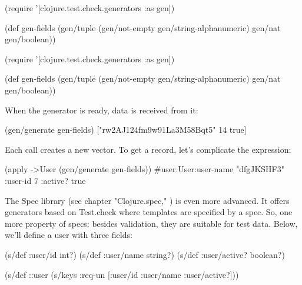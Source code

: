 \ifnarrow

\begin{english}
  \begin{clojure}
(require
 '[clojure.test.check.generators
   :as gen])

(def gen-fields
  (gen/tuple
    (gen/not-empty
      gen/string-alphanumeric)
    gen/nat
    gen/boolean))
  \end{clojure}
\end{english}

\else

\begin{english}
  \begin{clojure}
(require '[clojure.test.check.generators :as gen])

(def gen-fields
  (gen/tuple (gen/not-empty gen/string-alphanumeric)
             gen/nat
             gen/boolean))
  \end{clojure}
\end{english}

\fi

When the generator is ready, data is received from it:

\begin{english}
  \begin{clojure}
(gen/generate gen-fields)
["rw2AJ124fm9w91La3M58Bqt5" 14 true]
  \end{clojure}
\end{english}

\noindent
Each call creates a new vector. To get a record, let's complicate the expression:

\begin{english}
  \begin{clojure}
(apply ->User (gen/generate gen-fields))
#user.User{:user-name "dfgJKSHF3"
           :user-id 7
           :active? true}
  \end{clojure}
\end{english}

The Spec library (see chapter "Clojure.spec," ) is even more advanced. It offers generators based on Test.check where templates are specified by a spec. So, one more property of specs: besides validation, they are suitable for test data. Below, we'll define a user with three fields:

\ifnarrow

\begin{english}
  \begin{clojure}
(s/def :user/id int?)
(s/def :user/name string?)
(s/def :user/active? boolean?)

(s/def ::user
  (s/keys :req-un [:user/id
                   :user/name
                   :user/active?]))
  \end{clojure}
\end{english}

